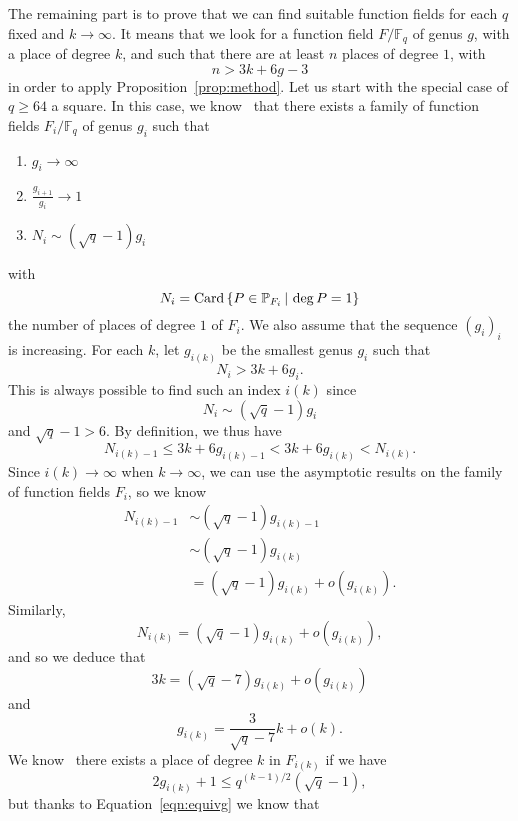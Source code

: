 \documentclass[11pt]{article}
\begin{document}
The remaining part is to prove that we can find suitable function fields for
each $q$ fixed and $k\to\infty$. It means that we look for a function field
$F/\mathbb{F}_q$ of genus $g$, with a place of degree $k$, and such that there
are at least $n$ places of degree $1$, with
\[
  n > 3k +6g - 3
\]
in order to apply Proposition~\ref{prop:method}. Let us start with the special case of $q\geq64$
a square. In this case, we know~\cite{STV92} that there exists a family of function fields
$F_i/\mathbb{F}_q$ of genus $g_i$ such that
\begin{enumerate}
  \item $g_i\to\infty$
  \item $\frac{g_{i+1}}{g_i}\to1$
  \item $N_i\sim (\sqrt q - 1)g_i$
\end{enumerate}
with
\[
  N_i = \operatorname{Card}\left\{ P\in\mathbb{P}_{F_i}\,|\,\deg P = 1 \right\}
\]
the number of places of degree $1$ of $F_i$. We also assume that the sequence
$(g_i)_i$ is increasing. For each $k$, let $g_{i(k)}$ be the
smallest genus $g_i$ such that
\[
  N_{i} > 3k + 6g_{i}.
\]
This is always possible to find such an index $i(k)$ since
\[
  N_i\sim (\sqrt q - 1)g_i
\]
and $\sqrt q -1 > 6$. By definition, we thus have
\[
  N_{i(k)-1}\leq 3k+6g_{i(k)-1}<3k+6g_{i(k)}<N_{i(k)}.
\]
Since $i(k)\to\infty$ when $k\to\infty$, we can use the asymptotic results on the
family of function fields $F_i$, so we know
\begin{equation*}
  \begin{split}
  N_{i(k)-1} &\sim (\sqrt q-1)g_{i(k)-1}\\
  &\sim (\sqrt q-1)g_{i(k)}\\
  &= (\sqrt q-1)g_{i(k)}+o(g_{i(k)}).
  \end{split}
\end{equation*}
Similarly,
\[
  N_{i(k)} = (\sqrt q -1)g_{i(k)}+o(g_{i(k)}),
\]
and so we deduce that
\begin{equation}
  3k = (\sqrt q -7)g_{i(k)} + o(g_{i(k)})
  \label{eqn:equivg}
\end{equation}
and
\begin{equation}
  g_{i(k)}= \frac{3}{\sqrt q - 7}k+o(k).
  \label{equivk}
\end{equation}
We know~\cite[Corollary 5.2.10.]{Stichtenoth09} there exists a place of degree
$k$ in $F_{i(k)}$ if we have
\begin{equation}
  2g_{i(k)} +1 \leq q^{(k-1)/2}(\sqrt q-1),
  \label{eqn:degreek}
\end{equation}
but thanks to Equation~\eqref{eqn:equivg} we know that
\end{document}
